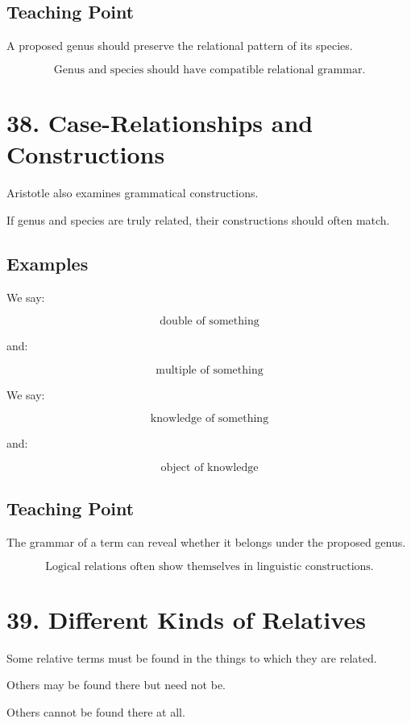 \documentclass[12pt]{article}
\begin{document}
\subsection*{Teaching Point}

A proposed genus should preserve the relational pattern of its species.

\[
\boxed{
\text{Genus and species should have compatible relational grammar.}
}
\]

\section*{38. Case-Relationships and Constructions}

Aristotle also examines grammatical constructions.

If genus and species are truly related, their constructions should often match.

\subsection*{Examples}

We say:

\[
\text{double of something}
\]

and:

\[
\text{multiple of something}
\]

We say:

\[
\text{knowledge of something}
\]

and:

\[
\text{object of knowledge}
\]

\subsection*{Teaching Point}

The grammar of a term can reveal whether it belongs under the proposed genus.

\[
\boxed{
\text{Logical relations often show themselves in linguistic constructions.}
}
\]

\section*{39. Different Kinds of Relatives}

Some relative terms must be found in the things to which they are related.

Others may be found there but need not be.

Others cannot be found there at all.
\end{document}
